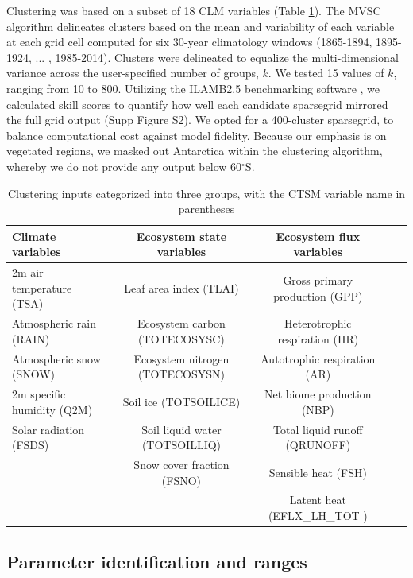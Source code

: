 \documentclass[draft]{agujournal2019}
\begin{document}
Clustering was based on a subset of 18 CLM variables (Table \ref{tab:sg}). The MVSC algorithm delineates clusters based on the mean and variability of each variable at each grid cell computed for six 30-year climatology windows (1865-1894, 1895-1924, ... , 1985-2014). Clusters were delineated to equalize the multi-dimensional variance across the user-specified number of groups, $k$. We tested 15 values of $k$, ranging from 10 to 800. Utilizing the ILAMB2.5 benchmarking software \cite{collier2018}, we calculated skill scores to quantify how well each candidate sparsegrid mirrored the full grid output (Supp Figure S2). We opted for a 400-cluster sparsegrid, to balance computational cost against model fidelity. Because our emphasis is on vegetated regions, we masked out Antarctica within the clustering algorithm, whereby we do not provide any output below 60$^\circ$S.

\begin{table}[h]
\caption{Clustering inputs categorized into three groups, with the CTSM variable name in parentheses}
\centering
\begin{tabular}{l c c c c}
 \hline
 Climate variables & Ecosystem state variables &Ecosystem flux variables \\
 \hline
 2m air temperature (TSA) & Leaf area index (TLAI) & Gross primary production (GPP) \\
Atmospheric rain (RAIN) & Ecosystem carbon (TOTECOSYSC) &Heterotrophic respiration (HR) \\
Atmospheric snow (SNOW) &  Ecosystem nitrogen (TOTECOSYSN) &Autotrophic respiration (AR) \\
2m specific humidity (Q2M) & Soil ice (TOTSOILICE) &Net biome production (NBP) \\
Solar radiation (FSDS) & Soil liquid water (TOTSOILLIQ) & Total liquid runoff (QRUNOFF) \\
& Snow cover fraction (FSNO) & Sensible heat  (FSH) \\
&&Latent heat (EFLX\_LH\_TOT ) \\
 \hline
 \end{tabular}
 \label{tab:sg}
 \end{table}

\subsection{Parameter identification and ranges}
\end{document}
